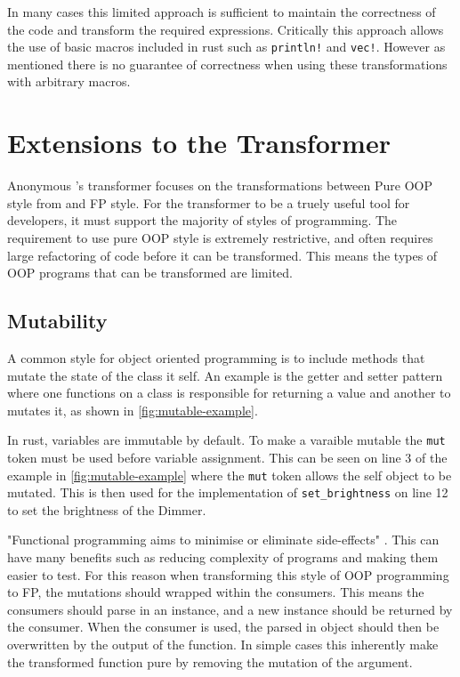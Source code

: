 \documentclass[ oneside,%
                    author={James Elgar},
                    degree={MEng},
                     title={Bidirectional transformer between functional and \\ object-oriented programming in Rust},
                  subtitle={}]{dissertation}
\newcommand{\weixin}{Anonymous }
\newcommand{\rust}[1]{\texttt{#1}}
\begin{document}
In many cases this limited approach is sufficient to maintain the correctness of the code and transform the required expressions. Critically this approach allows the use of basic macros included in rust such as \rust{println!} and \rust{vec!}. However as mentioned there is no guarantee of correctness when using these transformations with arbitrary macros.

\chapter{Extensions to the Transformer}

\weixin's transformer focuses on the transformations between Pure OOP style from \cite{cook} and FP style. For the transformer to be a truely useful tool for developers, it must support the majority of styles of programming. 
The requirement to use pure OOP style is extremely restrictive, and often requires large refactoring of code before it can be transformed.
This means the types of OOP programs that can be transformed are limited.

\section{Mutability}

A common style for object oriented programming is to include methods that mutate the state of the class it self. An example is the getter and setter pattern where one functions on a class is responsible for returning a value and another to mutates it, as shown in \autoref{fig:mutable-example}.

In rust, variables are immutable by default. To make a varaible mutable the \rust{mut} token must be used before variable assignment. This can be seen on line 3 of the example in \autoref{fig:mutable-example} where the \verb|mut| token allows the self object to be mutated. This is then used for the implementation of \rust{set_brightness} on line 12 to set the brightness of the Dimmer. 

"Functional programming aims to minimise or eliminate side-effects" \cite{fp-uok}. This can have many benefits such as reducing complexity of programs and making them easier to test. For this reason when transforming this style of OOP programming to FP, the mutations should wrapped within the consumers. This means the consumers should parse in an instance, and a new instance should be returned by the consumer. When the consumer is used, the parsed in object should then be overwritten by the output of the function.  In simple cases this inherently make the transformed function pure by removing the mutation of the argument.
\end{document}
